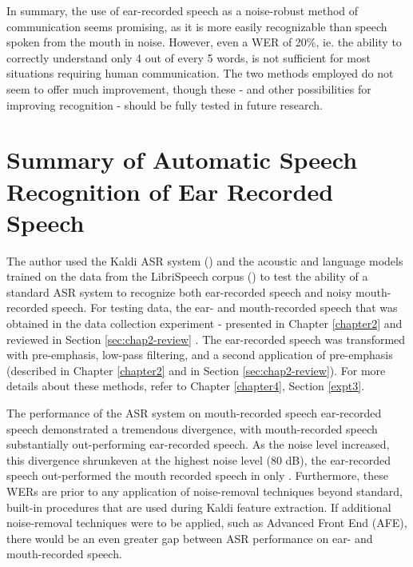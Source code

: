 In summary, the use of ear-recorded speech as a noise-robust method of communication seems promising, as it is more easily recognizable than speech spoken from the mouth in noise.  However, even a WER of 20\%, ie. the ability to correctly understand only 4 out of every 5 words, is not sufficient for most situations requiring human communication.  The two methods employed do not seem to offer much improvement, though these - and other possibilities for improving recognition - should be fully tested in future research.



\section{Summary of Automatic Speech Recognition of Ear Recorded Speech}\label{sec:chap4-review}

The author used the Kaldi ASR system (\cite{povey:11}) and the acoustic and language models trained on the data from the LibriSpeech corpus (\cite{panayotov:15}) to test the ability of a standard ASR system to recognize both ear-recorded speech and noisy mouth-recorded speech.  For testing data, the ear- and mouth-recorded speech that was \DIFdelbegin {}\DIFdelend obtained in the data collection experiment - presented in Chapter \ref{chapter2} and reviewed in Section \ref{sec:chap2-review} \DIFaddbegin {}\DIFaddend .  The ear-recorded speech was transformed with pre-emphasis, low-pass filtering, and a second application of pre-emphasis (described in Chapter \ref{chapter2} and in Section \ref{sec:chap2-review}). For more details about these methods, refer to Chapter \ref{chapter4}, Section \ref{expt3}.

The performance of the ASR system on \DIFdelbegin {}\DIFdelend mouth-recorded speech \DIFdelbegin {}%
\DIFdelend \DIFaddbegin {}\DIFaddend ear-recorded speech \DIFdelbegin {}%
\DIFdelend demonstrated a tremendous divergence, with mouth-recorded speech substantially out-performing ear-recorded speech.  As the noise level increased, \DIFaddbegin {}\DIFaddend this divergence shrunk\DIFdelbegin {}\DIFdelend \DIFaddbegin {}\DIFaddend even at the highest noise level (80 dB), the ear-recorded speech \DIFaddbegin {}\DIFaddend out-performed the mouth recorded speech in only \DIFdelbegin {}\DIFdelend \DIFaddbegin {}\DIFaddend .  Furthermore, these WERs are prior to any application of noise-removal techniques beyond standard, built-in procedures that are used during Kaldi feature extraction.  If additional noise-removal techniques were to be applied, such as Advanced Front End (AFE), there would be an even greater gap between ASR performance on ear- and mouth-recorded speech.

